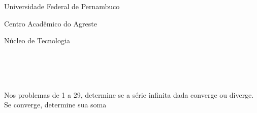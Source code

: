 \documentclass[oneside,a4paper,12pt]{article}
\newcommand{\universidade}{Universidade Federal de Pernambuco}
\newcommand{\centro}{Centro Acadêmico do Agreste}
\newcommand{\departamento}{Núcleo de Tecnologia}
\begin{document}
	\tiny
	\pagestyle{empty}
	
	\begin{center}
	 	\vspace{0pt}
	 	
		\universidade
		\par
		\centro
		\par
		\departamento
		\par
		\vspace{08pt}
		\\
		\\
			\\	
	\end{center}
	
	
Nos problemas de 1 a 29, determine se a série infinita dada converge ou diverge. Se converge, determine sua soma
\end{document}
